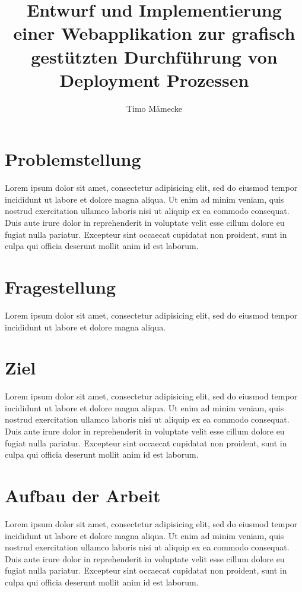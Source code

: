\documentclass{scrartcl}
\begin{document}
\titlehead{\texttt{[image: assets/logo\_th-koeln.eps]}}
\subject{Exposé}
\title{Entwurf und Implementierung einer Webapplikation zur grafisch gestützten Durchführung von Deployment Prozessen}
\author{Timo Mämecke}
\publishers{Erstprüfer: Prof. Christian Noss\\
Zweitprüfer: Dirk Breuer
}
\maketitle

\tableofcontents

\section{Problemstellung}
\label{sec:problemstellung}
Lorem ipsum dolor sit amet, consectetur adipisicing elit, sed do eiusmod tempor incididunt ut labore et dolore magna aliqua. Ut enim ad minim veniam, quis nostrud exercitation ullamco laboris nisi ut aliquip ex ea commodo consequat. Duis aute irure dolor in reprehenderit in voluptate velit esse cillum dolore eu fugiat nulla pariatur. Excepteur sint occaecat cupidatat non proident, sunt in culpa qui officia deserunt mollit anim id est laborum.

\section{Fragestellung}
\label{sec:fragestellung}
Lorem ipsum dolor sit amet, consectetur adipisicing elit, sed do eiusmod tempor incididunt ut labore et dolore magna aliqua.

\section{Ziel}
\label{sec:ziel}
Lorem ipsum dolor sit amet, consectetur adipisicing elit, sed do eiusmod tempor incididunt ut labore et dolore magna aliqua. Ut enim ad minim veniam, quis nostrud exercitation ullamco laboris nisi ut aliquip ex ea commodo consequat. Duis aute irure dolor in reprehenderit in voluptate velit esse cillum dolore eu fugiat nulla pariatur. Excepteur sint occaecat cupidatat non proident, sunt in culpa qui officia deserunt mollit anim id est laborum.

\section{Aufbau der Arbeit}
\label{sec:aufbau}
Lorem ipsum dolor sit amet, consectetur adipisicing elit, sed do eiusmod tempor incididunt ut labore et dolore magna aliqua. Ut enim ad minim veniam, quis nostrud exercitation ullamco laboris nisi ut aliquip ex ea commodo consequat. Duis aute irure dolor in reprehenderit in voluptate velit esse cillum dolore eu fugiat nulla pariatur. Excepteur sint occaecat cupidatat non proident, sunt in culpa qui officia deserunt mollit anim id est laborum.
\end{document}
